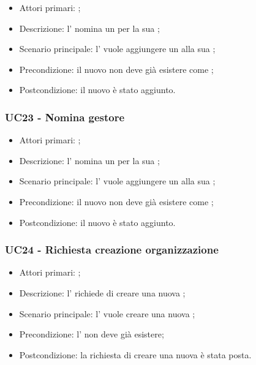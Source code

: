 \documentclass[../analisi-dei-requisiti]{subfiles}
\begin{document}
\begin{itemize}
\item Attori primari: ;
\item Descrizione: l'  nomina un  per la sua ;
\item Scenario principale: l'  vuole aggiungere un  alla sua ;
\item Precondizione: il nuovo  non deve già esistere come ;
\item Postcondizione: il nuovo  è stato aggiunto.

\end{itemize}


\subsubsection{UC23 - Nomina gestore}
\label{subsub:UC23}

\begin{itemize}
\item Attori primari: ;
\item Descrizione: l'  nomina un  per la sua ;
\item Scenario principale: l'  vuole aggiungere un  alla sua ;
\item Precondizione: il nuovo  non deve già esistere come ;
\item Postcondizione: il nuovo  è stato aggiunto.

\end{itemize}


\subsubsection{UC24 - Richiesta creazione organizzazione}
\label{subsub:UC24}

\begin{itemize}
\item Attori primari: ;
\item Descrizione: l'  richiede di creare una nuova ;
\item Scenario principale: l'  vuole creare una nuova ;
\item Precondizione: l'  non deve già esistere;
\item Postcondizione: la richiesta di creare una nuova  è stata posta.

\end{itemize}

\end{document}
